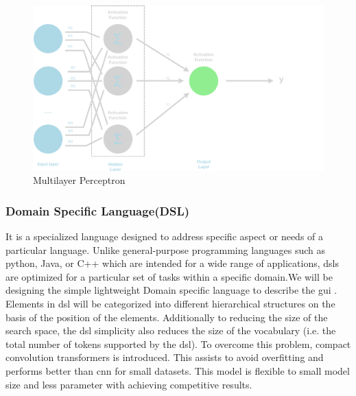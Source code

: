 \documentclass{ioereport}
\begin{document}
\begin{figure}[H]
    \centering
    \includegraphics[width=\textwidth]{images/mlp.png}\caption{Multilayer Perceptron}\label{fig:mlp}
\end{figure}







\subsubsection{Domain Specific Language(DSL)}
It is a specialized language designed to address specific aspect or needs of a particular
language. Unlike general-purpose programming languages such as python, Java, or
C++ which are intended for a wide range of applications, \gls{dsl}s are optimized for a
particular set of tasks within a specific domain.We will be designing the simple lightweight Domain specific language to describe the
\gls{gui} . Elements in \gls{dsl} will be categorized into different
hierarchical structures on the basis of the position of the elements. Additionally to
reducing the size of the search space, the \gls{dsl} simplicity also reduces the size of the
vocabulary (i.e. the total number of tokens supported by the \gls{dsl}). To overcome this
problem, compact convolution transformers is introduced. This assists to avoid
overfitting and performs better than \gls{cnn} for small datasets. This model is flexible to
small model size and less parameter with achieving competitive results.
\end{document}
